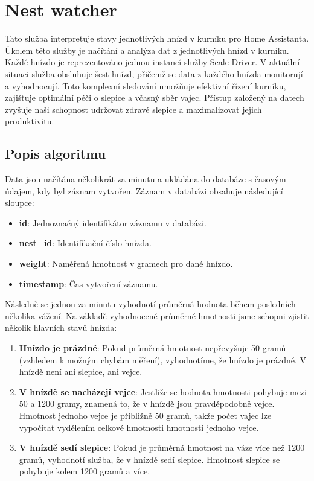\section{Nest watcher}\label{sec:nest-watcher}
Tato služba interpretuje stavy jednotlivých hnízd v kurníku pro Home Assistanta.
Úkolem této služby je načítání a analýza dat z jednotlivých hnízd v kurníku.
Každé hnízdo je reprezentováno jednou instancí služby Scale Driver.\newline
V aktuální situaci služba obsluhuje šest hnízd, přičemž se data z každého hnízda monitorují a vyhodnocují.
Toto komplexní sledování umožňuje efektivní řízení kurníku, zajišťuje optimální péči o slepice a včasný sběr vajec.
Přístup založený na datech zvyšuje naši schopnost udržovat zdravé slepice a maximalizovat jejich produktivitu.\newline

\subsection*{Popis algoritmu}

Data jsou načítána několikrát za minutu a ukládána do databáze s časovým údajem, kdy byl záznam vytvořen.
Záznam v databázi obsahuje následující sloupce:

\begin{itemize}
    \item \textbf{id}: Jednoznačný identifikátor záznamu v databázi.
    \item \textbf{nest\_id}: Identifikační číslo hnízda.
    \item \textbf{weight}: Naměřená hmotnost v gramech pro dané hnízdo.
    \item \textbf{timestamp}: Čas vytvoření záznamu.
\end{itemize}

Následně se jednou za minutu vyhodnotí průměrná hodnota během posledních několika vážení.
Na základě vyhodnocené průměrné hmotnosti jsme schopni zjistit několik hlavních stavů hnízda:

\begin{enumerate}
    \item \textbf{Hnízdo je prázdné}: Pokud průměrná hmotnost nepřevyšuje 50 gramů (vzhledem k možným chybám měření), vyhodnotíme, že hnízdo je prázdné.
    V hnízdě není ani slepice, ani vejce.
    \item \textbf{V hnízdě se nacházejí vejce}: Jestliže se hodnota hmotnosti pohybuje mezi 50 a 1200 gramy, znamená to, že v hnízdě jsou pravděpodobně vejce.
    Hmotnost jednoho vejce je přibližně 50 gramů, takže počet vajec lze vypočítat vydělením celkové hmotnosti hmotností jednoho vejce.
    \item \textbf{V hnízdě sedí slepice}: Pokud je průměrná hmotnost na váze více než 1200 gramů, vyhodnotí služba, že v hnízdě sedí slepice.
    Hmotnost slepice se pohybuje kolem 1200 gramů a více.
\end{enumerate}

